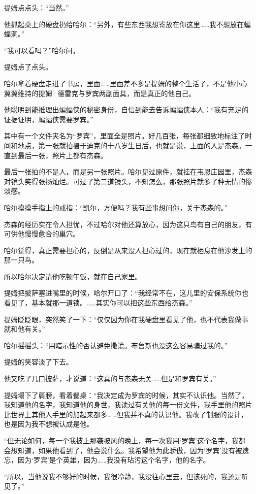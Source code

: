 \documentclass[../main]{subfiles}
\begin{document}
提姆点点头：“当然。”

他抓起桌上的硬盘扔给哈尔：“另外，有些东西我想寄放在你这里……我不想放在蝙蝠洞。”

“我可以看吗？”哈尔问。

提姆点了点头。

哈尔拿着硬盘走进了书房，里面……里面差不多是提姆的整个生活了，不是他小心翼翼维持的提姆·德雷克与罗宾两副面具，而是真正的他自己。

他聪明到能推理出蝙蝠侠的秘密身份，自信到能去告诉蝙蝠侠本人：“我有充足的证据证明，蝙蝠侠需要罗宾。”

其中有一个文件夹名为“罗宾”，里面全是照片。好几百张，每张都细致地标注了时间和地点，第一张就拍摄于迪克的十八岁生日后，也就是说，上面的人是杰森。一直到最后一张，照片上都有杰森。

最后一张拍的不是人，而是另一张照片。哈尔见过原件，就挂在韦恩庄园里，杰森对镜头笑得张扬灿烂。可过了第二道镜头，不知怎么，那张照片就多了种无情的惨淡感。

哈尔摸摸手指上的戒指：“凯尔，方便吗？我有些事想问你，关于杰森的。”

杰森的经历实在令人担忧，不过哈尔对他还算放心，因为这只鸟有自己的朋友，有可供他慢慢愈合的巢穴。

哈尔觉得，真正需要担心的，反倒是从来没人担心过的，现在就栖息在他沙发上的那一只鸟。

所以哈尔决定请他吃顿午饭，就在自己家里。

提姆把披萨塞进嘴里的时候，哈尔开口了：“我经常不在，这儿里的安保系统你也看见了，基本就那一道锁。……其实你可以把这些东西给杰森。”

提姆眨眨眼，突然笑了一下：“仅仅因为你在我硬盘里看见了他，也不代表我做事就和他有关。”

哈尔摇摇头：“用暗示性的否认避免撒谎。布鲁斯也没这么容易骗过我的。”

提姆的笑容淡了下去。

他又吃了几口披萨，才说道：“这真的与杰森无关……但是和罗宾有关。”

提姆塌下了肩膀，看着餐桌：“我决定成为罗宾的时候，其实不认识他。当然了，我知道他的名字，我知道他的身世，我读过有关他的每一份文件，我手里他的照片比世界上其他人手里的加起来都多……但我并不真的认识他。我改了制服的设计，也是因为我不想被认成是他。

“但无论如何，每一个我披上那袭披风的晚上，每一次我用`罗宾'这个名字，我都会想知道，如果他看到了，他会说什么。我希望他为此骄傲，因为`罗宾'没有被遗忘，因为`罗宾'是个英雄，因为……我没有玷污这个名字，他的名字。

“所以，当他说我不够好的时候，我很冷静，我没往心里去，但该死的，我还是听见了。”
\end{document}
